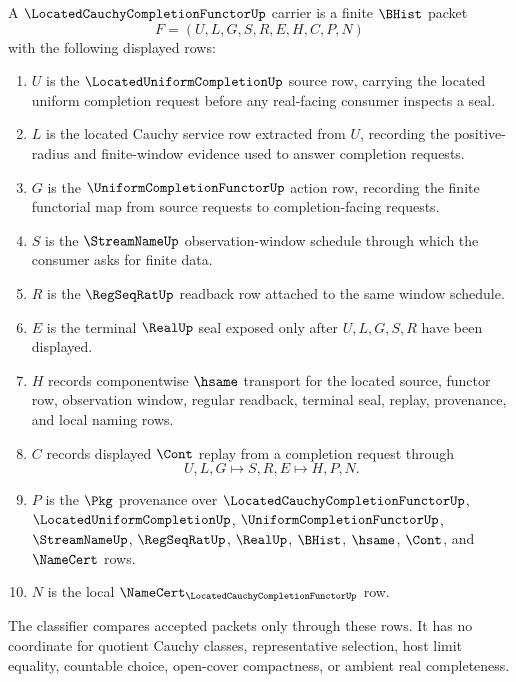 \begin{definition}
\label{def:located-cauchy-completion-functor-carrier}
A $\LocatedCauchyCompletionFunctorUp$ carrier is a finite $\BHist$ packet
$$
F=(U,L,G,S,R,E,H,C,P,N)
$$
with the following displayed rows:
\begin{enumerate}
\item $U$ is the $\LocatedUniformCompletionUp$ source row, carrying the located uniform completion request before any real-facing consumer inspects a seal.
\item $L$ is the located Cauchy service row extracted from $U$, recording the positive-radius and finite-window evidence used to answer completion requests.
\item $G$ is the $\UniformCompletionFunctorUp$ action row, recording the finite functorial map from source requests to completion-facing requests.
\item $S$ is the $\StreamNameUp$ observation-window schedule through which the consumer asks for finite data.
\item $R$ is the $\RegSeqRatUp$ readback row attached to the same window schedule.
\item $E$ is the terminal $\RealUp$ seal exposed only after $U,L,G,S,R$ have been displayed.
\item $H$ records componentwise $\hsame$ transport for the located source, functor row, observation window, regular readback, terminal seal, replay, provenance, and local naming rows.
\item $C$ records displayed $\Cont$ replay from a completion request through
$$
U,L,G \longmapsto S,R,E \longmapsto H,P,N .
$$
\item $P$ is the $\Pkg$ provenance over $\LocatedCauchyCompletionFunctorUp$, $\LocatedUniformCompletionUp$, $\UniformCompletionFunctorUp$, $\StreamNameUp$, $\RegSeqRatUp$, $\RealUp$, $\BHist$, $\hsame$, $\Cont$, and $\NameCert$ rows.
\item $N$ is the local $\NameCert_{\LocatedCauchyCompletionFunctorUp}$ row.
\end{enumerate}
The classifier compares accepted packets only through these rows. It has no coordinate for quotient Cauchy classes, representative selection, host limit equality, countable choice, open-cover compactness, or ambient real completeness.
\end{definition}

